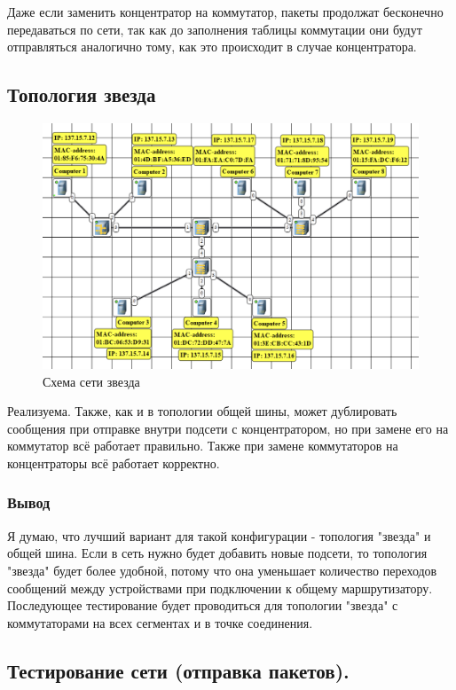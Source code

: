 \documentclass[12pt,onecolumn]{article}
\begin{document}
Даже если заменить концентратор на коммутатор, пакеты продолжат бесконечно передаваться по сети, так как до заполнения таблицы коммутации они будут отправляться аналогично тому, как это происходит в случае концентратора. 

\subsection{Топология звезда}
\begin{figure}[H]
  \centering
  \includegraphics[width=\textwidth]{image/part3/star.png}
  \caption{Схема сети звезда}
\end{figure}

Реализуема. Также, как и в топологии общей шины, может дублировать сообщения при отправке внутри подсети с концентратором, но при замене его на коммутатор всё работает правильно. Также при замене коммутаторов на концентраторы всё работает корректно.

\subsubsection{Вывод}
Я думаю, что лучший вариант для такой конфигурации - топология "звезда" и общей шина. Если в сеть нужно будет добавить новые подсети, то топология "звезда" будет более удобной, потому что она уменьшает количество переходов сообщений между устройствами при подключении к общему маршрутизатору. Последующее тестирование будет проводиться для топологии "звезда"  с коммутаторами на всех сегментах и в точке соединения.

\subsection{Тестирование сети (отправка пакетов).}
\end{document}
